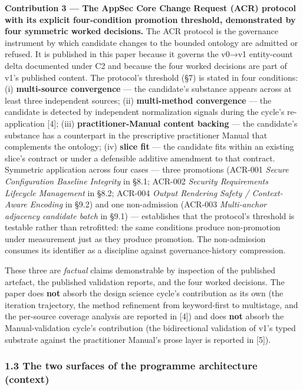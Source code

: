 \documentclass[
]{article}
\begin{document}
\textbf{Contribution 3 --- The AppSec Core Change Request (ACR) protocol
with its explicit four-condition promotion threshold, demonstrated by
four symmetric worked decisions.} The ACR protocol is the governance
instrument by which candidate changes to the bounded ontology are
admitted or refused. It is published in this paper because it governs
the v0→v1 entity-count delta documented under C2 and because the four
worked decisions are part of v1's published content. The protocol's
threshold (§7) is stated in four conditions: (i) \textbf{multi-source
convergence} --- the candidate's substance appears across at least three
independent sources; (ii) \textbf{multi-method convergence} --- the
candidate is detected by independent normalization signals during the
cycle's re-application {[}4{]}; (iii) \textbf{practitioner-Manual
content backing} --- the candidate's substance has a counterpart in the
prescriptive practitioner Manual that complements the ontology; (iv)
\textbf{slice fit} --- the candidate fits within an existing slice's
contract or under a defensible additive amendment to that contract.
Symmetric application across four cases --- three promotions (ACR-001
\emph{Secure Configuration Baseline Integrity} in §8.1; ACR-002
\emph{Security Requirements Lifecycle Management} in §8.2; ACR-004
\emph{Output Rendering Safety / Context-Aware Encoding} in §9.2) and one
non-admission (ACR-003 \emph{Multi-anchor adjacency candidate batch} in
§9.1) --- establishes that the protocol's threshold is testable rather
than retrofitted: the same conditions produce non-promotion under
measurement just as they produce promotion. The non-admission consumes
its identifier as a discipline against governance-history compression.

These three are \emph{factual} claims demonstrable by inspection of the
published artefact, the published validation reports, and the four
worked decisions. The paper does \textbf{not} absorb the design science
cycle's contribution as its own (the iteration trajectory, the method
refinement from keyword-first to multistage, and the per-source coverage
analysis are reported in {[}4{]}) and does \textbf{not} absorb the
Manual-validation cycle's contribution (the bidirectional validation of
v1's typed substrate against the practitioner Manual's prose layer is
reported in {[}5{]}).

\subsubsection{1.3 The two surfaces of the programme architecture
(context)}\label{the-two-surfaces-of-the-programme-architecture-context}
\end{document}
